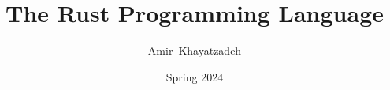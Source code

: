 \documentclass[10pt]{beamer}
\title{The Rust Programming Language}
\author{Amir~Khayatzadeh}
\institute[IAUM]{Department of Computer Engineering\\ Islamic Azad University, Mashhad Branch}
\date{Spring 2024}
\begin{document}
\begin{frame}[plain]
    \titlepage
\end{frame}

%
%
%
%
%
\end{document}
